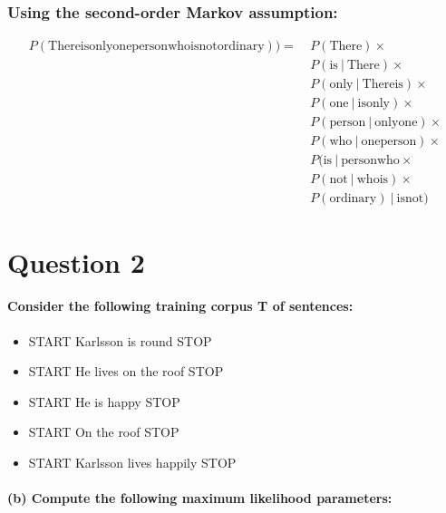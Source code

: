 \documentclass{article}
\newcommand\given[1][]{\:#1\vert\:}
\begin{document}
\subsubsection*{Using the second-order Markov assumption:}

\begin{equation*}
    \begin{split}
    P(\text{There}
\text{is}
\text{only}
\text{one}
\text{person}
\text{who}
\text{is}
\text{not}
\text{ordinary})) =\ & P(\text{There}) \times \\
    & P(\text{is} \given \text{There}) \times \\
    & P(\text{only} \given \text{There}
\text{is} ) \times \\
    & P(\text{one} \given \text{is}
\text{only}) \times \\
    & P(\text{person} \given  \text{only}
\text{one}) \times \\
    & P(\text{who} \given 
\text{one}
\text{person}) \times \\
    & P(\text{is} \given \text{person}
\text{who} \times \\
    & P(\text{not}
\given \text{who}
\text{is}) \times \\
    & P(\text{ordinary}) \given \text{is}
\text{not})
    \end{split}
\end{equation*}

\clearpage

\section*{Question 2}

\paragraph{Consider the following training corpus T of sentences:}

\begin{itemize}
    \item START Karlsson is round STOP
    \item START He lives on the roof STOP
    \item START He is happy STOP
    \item START On the roof STOP
    \item START Karlsson lives happily STOP
\end{itemize}

\paragraph{(b) Compute the following maximum likelihood parameters:}
\end{document}

